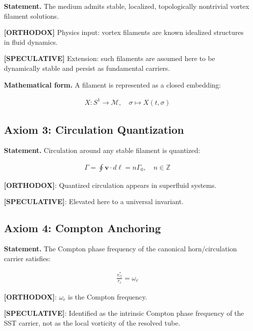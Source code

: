 \documentclass[11pt]{article}
\theoremstyle{definition}
\theoremstyle{plain}
\theoremstyle{remark}
\newcommand{\rc}{{r_c}}
\newcommand{\vchar}{v_{\!\boldsymbol{\circlearrowleft}}^{\ast}}
\begin{document}
        \textbf{Statement.}
        The medium admits stable, localized, topologically nontrivial vortex filament solutions.
        
        \textbf{[ORTHODOX]} Physics input: vortex filaments are known idealized structures in fluid dynamics.

        \textbf{[SPECULATIVE]} Extension: such filaments are assumed here to be dynamically stable and persist as fundamental carriers.
        
        \textbf{Mathematical form.}
        A filament is represented as a closed embedding:
        
        \begin{align}
            X: S^1 \to \mathcal{M}, \quad \sigma \mapsto X(t,\sigma)
        \end{align}
    
    \subsection{Axiom 3: Circulation Quantization}
        
        \textbf{Statement.}
        Circulation around any stable filament is quantized:
        
        \begin{align}
            \Gamma = \oint \mathbf{v} \cdot d\ell = n \Gamma_0, \quad n \in \mathbb{Z}
        \end{align}
        
        \textbf{[ORTHODOX]}: Quantized circulation appears in superfluid systems.
        
        \textbf{[SPECULATIVE]}: Elevated here to a universal invariant.
    
    \subsection{Axiom 4: Compton Anchoring}
        
        \textbf{Statement.}
        The Compton phase frequency of the canonical horn/circulation carrier satisfies:
        
        \begin{align}
            \frac{\vchar}{\rc} = \omega_c
        \end{align}
        
        \textbf{[ORTHODOX]}: $\omega_c$ is the Compton frequency.
        
        \textbf{[SPECULATIVE]}: Identified as the intrinsic Compton phase frequency of the SST carrier, not as the local vorticity of the resolved tube.
        
\end{document}
